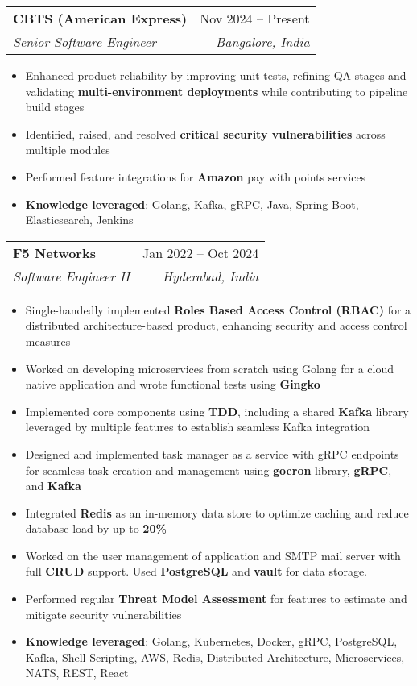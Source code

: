 \documentclass[letterpaper,12pt]{article}
\makeatletter
\newcommand{\resumeItem}[1]{
  \item\small{
    {#1 \vspace{-2pt}}
  }
}
\newcommand{\resumeSubheading}[4]{
  \vspace{-2pt}\item
    \begin{tabular*}{0.97\textwidth}[t]{l@{\extracolsep{\fill}}r}
      \textbf{#1} & #2 \\
      \textit{\small#3} & \textit{\small #4} \\
    \end{tabular*}\vspace{-7pt}
}
\newcommand{\resumeItemListStart}{\begin{itemize}}
\newcommand{\resumeItemListEnd}{\end{itemize}\vspace{-5pt}}
\makeatother
\begin{document}
	\resumeSubheading
      {CBTS (American Express)}{Nov 2024 -- Present}
      {Senior Software Engineer}{Bangalore, India}
      \resumeItemListStart
        \resumeItem{Enhanced product reliability by improving unit tests, refining QA stages and validating \textbf{multi-environment deployments} while contributing to pipeline build stages}
		\resumeItem{Identified, raised, and resolved \textbf{critical security vulnerabilities} across multiple modules}
        \resumeItem{Performed feature integrations for \textbf{Amazon} pay with points services}\phantom{GCP, Terraform, Spring}
        \resumeItem{\textbf{Knowledge leveraged}: Golang, Kafka, gRPC, Java, Spring Boot, Elasticsearch, Jenkins}
      \resumeItemListEnd
          \vspace{10pt}
          
    \resumeSubheading
      {F5 Networks}{Jan 2022 -- Oct 2024}
      {Software Engineer II}{Hyderabad, India}
      \resumeItemListStart
        \resumeItem{Single-handedly implemented \textbf{Roles Based Access Control (RBAC)} for a distributed architecture-based product,
enhancing security and access control measures \phantom{J2EE, Java, Redis}}
		\resumeItem{Worked on developing microservices from scratch using Golang for a cloud native application and wrote functional tests
using \textbf{Gingko} \phantom{AWS, Go, Jenkins, Terraform, Java, Golang}}
        \resumeItem{Implemented core components using \textbf{TDD}, including a shared \textbf{Kafka} library leveraged by multiple features to establish seamless Kafka integration \phantom{Distributed systems, Java, Spring boot}}
        \resumeItem{Designed and implemented task manager as a service with gRPC endpoints for seamless task creation and management using \textbf{gocron} library, \textbf{gRPC}, and \textbf{Kafka} \phantom{Hibernate, Security, Spring boot}}
        \resumeItem{Integrated \textbf{Redis} as an in-memory data store to optimize caching and reduce database load by up to \textbf{20\%} \phantom{Golang, Concurrency, Linux scripting, Test Driven Development(TDD), ReactJS, SOLID}}
        \resumeItem{Worked on the user management of application and SMTP mail server with full \textbf{CRUD} support. Used \textbf{PostgreSQL} and \textbf{vault} for data storage.}
        \resumeItem{Performed regular \textbf{Threat Model Assessment} for features to estimate and mitigate security vulnerabilities \phantom{Computer Networks, IPV4/6,TCP,UDP,HTTP,L4-L7, DNS, Openshift}}
        \resumeItem{\textbf{Knowledge leveraged}: Golang, Kubernetes, Docker, gRPC, PostgreSQL, Kafka, Shell Scripting, AWS, Redis, Distributed Architecture, Microservices, NATS, REST, React}\phantom{HTML/CSS,Javascript,Redis}
      \resumeItemListEnd
          \vspace{10pt}
\end{document}
